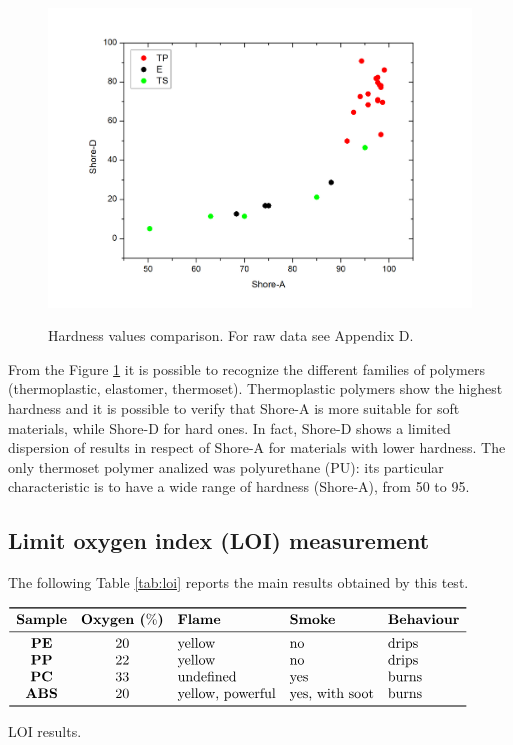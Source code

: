 \documentclass[a4paper, 11pt]{article}
\begin{document}
\begin{figure}[htp]
	\centering
	{\includegraphics[scale=0.3]{duro}}
	\captionsetup{justification=centering}
	\caption{Hardness values comparison. For raw data see Appendix D.}
	\label{fig:duro}
\end{figure}

From the Figure \ref{fig:duro} it is possible to recognize the different families of polymers (thermoplastic, elastomer, thermoset). Thermoplastic polymers show the highest hardness and it is possible to verify that Shore-A is more suitable for soft materials, while Shore-D for hard ones. In fact, Shore-D shows a limited dispersion of results in respect of Shore-A for materials with lower hardness. The only thermoset polymer analized was polyurethane (PU): its particular characteristic is to have a wide range of hardness (Shore-A), from 50 to 95.

\subsection{Limit oxygen index (LOI) measurement} 

The following Table \ref{tab:loi} reports the main results obtained by this test.
\begin{table}[htp]
	\centering
	$
	\begin{array}{cclll}
	\toprule
	\textbf{Sample} & \textbf{Oxygen ($\%$)} & \textbf{Flame} & \textbf{Smoke} & \textbf{Behaviour} \\
	\midrule
	\textbf{PE} & 20 & \text{yellow} & \text{no} & \text{drips}\\
	\textbf{PP} & 22 & \text{yellow} & \text{no} & \text{drips}\\
	\textbf{PC} & 33 & \text{undefined} & \text{yes} & \text{burns}\\
	\textbf{ABS} & 20 & \text{yellow, powerful} & \text{yes, with soot} & \text{burns}\\
	\bottomrule
	\end{array}
	$
	\caption{LOI results.}
	\label{tab:loi}
\end{table}
\end{document}
